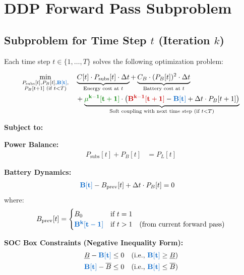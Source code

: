 \documentclass[11pt]{article}
\newcommand{\blueB}[1]{\textcolor{bluevar}{\mathbf{#1}}}      %
\newcommand{\redB}[1]{\textcolor{redvar}{\mathbf{#1}}}        %
\newcommand{\greenmu}[1]{\textcolor{greenvar}{\mathbf{#1}}}   %
\begin{document}
\section{DDP Forward Pass Subproblem}

\subsection{Subproblem for Time Step $t$ (Iteration $k$)}

Each time step $t \in \{1, \ldots, T\}$ solves the following optimization problem:

\begin{align}
\min_{\substack{P_{\text{subs}}[t], P_B[t], \blueB{B[t]}, \\ P_B[t+1] \text{ (if } t < T\text{)}}} \quad & \underbrace{C[t] \cdot P_{\text{subs}}[t] \cdot \Delta t}_{\text{Energy cost at } t} + \underbrace{C_B \cdot (P_B[t])^2 \cdot \Delta t}_{\text{Battery cost at } t} \notag \\
& + \underbrace{\greenmu{\mu^{k-1}[t+1]} \cdot \left( \redB{B^{k-1}[t+1]} - \blueB{B[t]} + \Delta t \cdot P_B[t+1] \right)}_{\text{Soft coupling with next time step (if } t < T\text{)}}
\end{align}

\textbf{Subject to:}

\textbf{Power Balance:}
\begin{align}
P_{\text{subs}}[t] + P_B[t] &= P_L[t]
\end{align}

\textbf{Battery Dynamics:}
\begin{align}
\blueB{B[t]} - B_{\text{prev}}[t] + \Delta t \cdot P_B[t] &= 0
\end{align}
where:
\begin{align}
B_{\text{prev}}[t] = \begin{cases}
B_0 & \text{if } t = 1 \\
\blueB{B^k[t-1]} & \text{if } t > 1 \quad \text{(from current forward pass)}
\end{cases}
\end{align}

\textbf{SOC Box Constraints (Negative Inequality Form):}
\begin{align}
\underline{B} - \blueB{B[t]} &\leq 0 \quad \text{(i.e., } \blueB{B[t]} \geq \underline{B}\text{)} \\
\blueB{B[t]} - \overline{B} &\leq 0 \quad \text{(i.e., } \blueB{B[t]} \leq \overline{B}\text{)}
\end{align}
\end{document}
